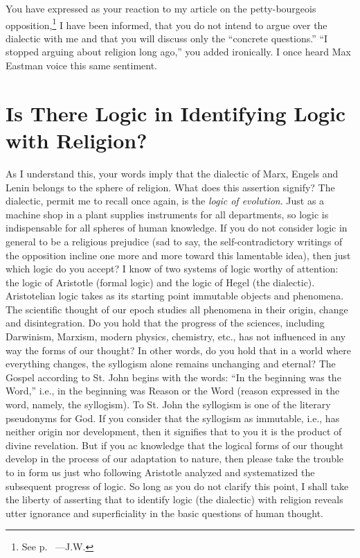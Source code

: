 \label{1940-01-07_an-open-letter-to-comrade-burnham}


You have expressed as your reaction to my article on the petty-bourgeois opposition,\footnote{See p.~\pageref{1939-12-15_a-petty-bourgeois-opposition-in-the-socialist-workers-party} ---J.W.} I have been informed, that you do not intend to argue over the dialectic with me and that you will discuss only the “concrete questions.” “I stopped arguing about religion long ago,” you added ironically. I once heard Max Eastman voice this same sentiment.

\section*{Is There Logic in Identifying Logic with Religion?}

As I understand this, your words imply that the dialectic of Marx, Engels and Lenin belongs to the sphere of religion. What does this assertion signify? The dialectic, permit me to recall once again, is the \emph{logic of evolution}. Just as a machine shop in a plant supplies instruments for all departments, so logic is indispensable for all spheres of human knowledge. If you do not consider logic in general to be a religious prejudice (sad to say, the self-contradictory writings of the opposition incline one more and more toward this lamentable idea), then just which logic do you accept? I know of two systems of logic worthy of attention: the logic of Aristotle (formal logic) and the logic of Hegel (the dialectic). Aristotelian logic takes as its starting point immutable objects and phenomena. The scientific thought of our epoch studies all phenomena in their origin, change and disintegration. Do you hold that the progress of the sciences, including Darwinism, Marxism, modern physics, chemistry, etc., has not influenced in any way the forms of our thought? In other words, do you hold that in a world where everything changes, the syllogism alone remains unchanging and eternal? The Gospel according to St. John begins with the words: “In the beginning was the Word,” i.e., in the beginning was Reason or the Word (reason expressed in the word, namely, the syllogism). To St. John the syllogism is one of the literary pseudonyms for God. If you consider that the syllogism as immutable, i.e., has neither origin nor development, then it signifies that to you it is the product of divine revelation. But if you ac knowledge that the logical forms of our thought develop in the process of our adaptation to nature, then please take the trouble to in form us just who following Aristotle analyzed and systematized the subsequent progress of logic. So long as you do not clarify this point, I shall take the liberty of asserting that to identify logic (the dialectic) with religion reveals utter ignorance and superficiality in the basic questions of human thought.

